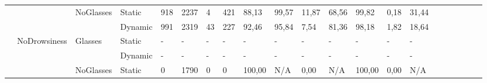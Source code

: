\documentclass[12pt]{article}
\begin{document}
\begin{landscape}
\begin{table}[]
\begin{adjustbox}{width=1.4\textwidth}
\begin{tabular}{lllllllllllllllccllll}
				\multicolumn{1}{|l|}{} & \multicolumn{1}{l|}{} & \multicolumn{1}{l|}{\multirow{2}{*}{NoGlasses}} & \multicolumn{1}{l|}{Static}  & \multicolumn{1}{l|}{918} & \multicolumn{1}{l|}{2237} & \multicolumn{1}{l|}{4} & \multicolumn{1}{l|}{421} & \multicolumn{1}{l|}{88,13} & \multicolumn{1}{l|}{99,57} & \multicolumn{1}{l|}{11,87} & \multicolumn{1}{l|}{68,56} & \multicolumn{1}{l|}{99,82} & \multicolumn{1}{l|}{0,18} & \multicolumn{1}{l|}{31,44} & \multicolumn{1}{c|}{} & \multicolumn{1}{c|}{} & \multicolumn{1}{l|}{} & \multicolumn{1}{l|}{} & \multicolumn{1}{l|}{} & \multicolumn{1}{l|}{}\\ \cline{4-15}				
				\multicolumn{1}{|l|}{} & \multicolumn{1}{l|}{} & \multicolumn{1}{l|}{} & \multicolumn{1}{l|}{Dynamic} & \multicolumn{1}{l|}{991} & \multicolumn{1}{l|}{2319} & \multicolumn{1}{l|}{43} & \multicolumn{1}{l|}{227} & \multicolumn{1}{l|}{92,46} & \multicolumn{1}{l|}{95,84} & \multicolumn{1}{l|}{7,54} & \multicolumn{1}{l|}{81,36} & \multicolumn{1}{l|}{98,18} & \multicolumn{1}{l|}{1,82} & \multicolumn{1}{l|}{18,64} & \multicolumn{1}{c|}{} & \multicolumn{1}{c|}{} & \multicolumn{1}{l|}{} & \multicolumn{1}{l|}{} & \multicolumn{1}{l|}{} & \multicolumn{1}{l|}{} \\ \cline{2-15}
				\multicolumn{1}{|l|}{} & \multicolumn{1}{l|}{\multirow{4}{*}{NoDrowsiness}} & \multicolumn{1}{l|}{\multirow{2}{*}{Glasses}} & \multicolumn{1}{l|}{Static} & \multicolumn{1}{l|}{-} & \multicolumn{1}{l|}{-} & \multicolumn{1}{l|}{-} & \multicolumn{1}{l|}{-} & \multicolumn{1}{l|}{-} & \multicolumn{1}{l|}{-} & \multicolumn{1}{l|}{-} & \multicolumn{1}{l|}{-} & \multicolumn{1}{l|}{-} & \multicolumn{1}{l|}{-} & \multicolumn{1}{l|}{-} & \multicolumn{1}{c|}{} & \multicolumn{1}{c|}{} & \multicolumn{1}{l|}{} & \multicolumn{1}{l|}{} & \multicolumn{1}{l|}{} & \multicolumn{1}{l|}{}\\ \cline{4-15}
				\multicolumn{1}{|l|}{} & \multicolumn{1}{l|}{} & \multicolumn{1}{l|}{} & \multicolumn{1}{l|}{Dynamic} & \multicolumn{1}{l|}{-} & \multicolumn{1}{l|}{-} & \multicolumn{1}{l|}{-} & \multicolumn{1}{l|}{-} & \multicolumn{1}{l|}{-} & \multicolumn{1}{l|}{-} & \multicolumn{1}{l|}{-} & \multicolumn{1}{l|}{-} & \multicolumn{1}{l|}{-} & \multicolumn{1}{l|}{-} & \multicolumn{1}{l|}{-} & \multicolumn{1}{c|}{} & \multicolumn{1}{c|}{} & \multicolumn{1}{l|}{} & \multicolumn{1}{l|}{} & \multicolumn{1}{l|}{} & \multicolumn{1}{l|}{}\\ \cline{3-15}
				\multicolumn{1}{|l|}{} & \multicolumn{1}{l|}{} & \multicolumn{1}{l|}{\multirow{2}{*}{NoGlasses}} & \multicolumn{1}{l|}{Static} & \multicolumn{1}{l|}{0} & \multicolumn{1}{l|}{1790} & \multicolumn{1}{l|}{0} & \multicolumn{1}{l|}{0} & \multicolumn{1}{l|}{100,00} & \multicolumn{1}{l|}{N/A} & \multicolumn{1}{l|}{0,00} & \multicolumn{1}{l|}{N/A} & \multicolumn{1}{l|}{100,00} & \multicolumn{1}{l|}{0,00} & \multicolumn{1}{l|}{N/A} & \multicolumn{1}{c|}{} & \multicolumn{1}{c|}{} & \multicolumn{1}{l|}{} & \multicolumn{1}{l|}{} & \multicolumn{1}{l|}{} & \multicolumn{1}{l|}{} \\ \cline{4-15}

\end{tabular}
\end{adjustbox}
\end{table}
\end{landscape}
\end{document}
